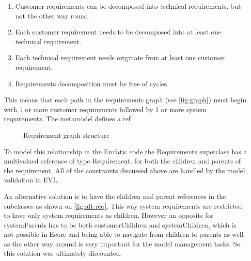 \documentclass[11pt,a4paper]{scrartcl}
\begin{document}
	\begin{enumerate} \label{lst:constraints}
		\item Customer requirements can be decomposed into technical requirements, but not the other way round.
		\item Each customer requirement needs to be decomposed into at least one technical requirement.
		\item Each technical requirement needs originate from at least one customer requirement.
		\item Requirements decomposition must be free of cycles.
	\end{enumerate}
	
	This means that each path in the requirements graph (see \autoref{fig:graph}) must begin with 1 or more customer requirements followed by 1 or more system requirements. The metamodel defines a ref
	
	\begin{figure}[h!]
		
		\centering
	
		
		\caption{Requirement graph structure}
		\label{fig:graph}
	\end{figure}	

	To model this relationship in the Emfatic code the Requirements superclass has a multivalued reference of type Requirement, for both the children and parents of the requirement. All of the constraints discussed above are handled by the model validation in EVL.
	
	An alternative solution is to have the children and parent references in the subclasses as shown on \autoref{fig:alt-req}. This way system requirements are restricted to have only system requirements as children. However an opposite for systemParents has to be both customerChildren and systemChildren, which is not possible in Ecore and being able to navigate from children to parents as well as the other way around is very important for the model management tasks. So this solution was ultimately discounted.
	
\end{document}
